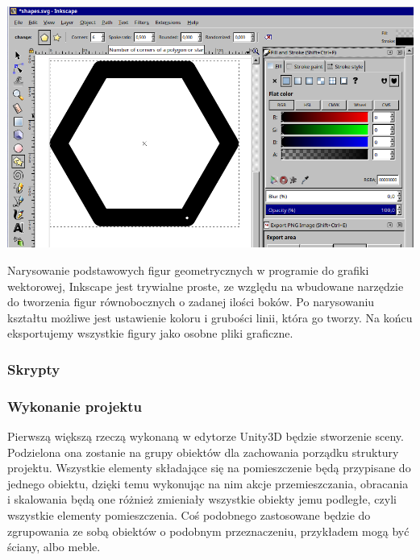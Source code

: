\documentclass{article} %
\begin{document}
            \begin{center}
            \includegraphics[scale=0.3,keepaspectratio=true]{images/screenshots/work/6-tworzenie-ui_002.png}
            \end{center}

            
            Narysowanie podstawowych figur geometrycznych w programie do grafiki wektorowej, Inkscape jest trywialne proste, ze względu na wbudowane narzędzie do tworzenia figur równobocznych o zadanej ilości boków. Po narysowaniu kształtu możliwe jest ustawienie koloru i grubości linii, która go tworzy. Na końcu eksportujemy wszystkie figury jako osobne pliki graficzne.
            \\
        
        \subsubsection{Skrypty}       

        \subsubsection{Wykonanie projektu}
            Pierwszą większą rzeczą wykonaną w edytorze Unity3D będzie stworzenie sceny. Podzielona ona zostanie na grupy obiektów dla zachowania porządku struktury projektu. Wszystkie elementy składające się na pomieszczenie będą przypisane do jednego obiektu, dzięki temu wykonując na nim akcje przemieszczania, obracania i skalowania będą one różnież zmieniały wszystkie obiekty jemu podległe, czyli wszystkie elementy pomieszczenia. Coś podobnego zastosowane będzie do zgrupowania ze sobą obiektów o podobnym przeznaczeniu, przykładem mogą być ściany, albo meble.
            \\
            
\end{document}
